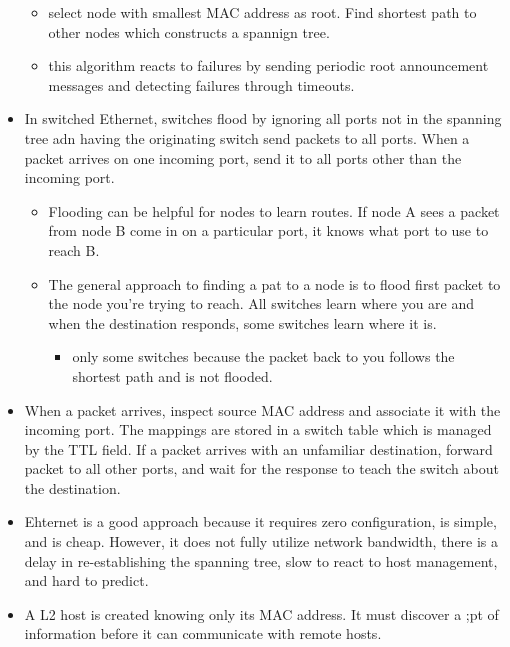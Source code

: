 \begin{itemize}
  \begin{itemize}
  \tightlist
  \item
    select node with smallest MAC address as root. Find shortest path to
    other nodes which constructs a spannign tree.
  \item
    this algorithm reacts to failures by sending periodic root
    announcement messages and detecting failures through timeouts.
  \end{itemize}
\item
  In switched Ethernet, switches flood by ignoring all ports not in the
  spanning tree adn having the originating switch send packets to all
  ports. When a packet arrives on one incoming port, send it to all
  ports other than the incoming port.

  \begin{itemize}
  \tightlist
  \item
    Flooding can be helpful for nodes to learn routes. If node A sees a
    packet from node B come in on a particular port, it knows what port
    to use to reach B.
  \item
    The general approach to finding a pat to a node is to flood first
    packet to the node you're trying to reach. All switches learn where
    you are and when the destination responds, some switches learn where
    it is.

    \begin{itemize}
    \tightlist
    \item
      only some switches because the packet back to you follows the
      shortest path and is not flooded.
    \end{itemize}
  \end{itemize}
\item
  When a packet arrives, inspect source MAC address and associate it
  with the incoming port. The mappings are stored in a switch table
  which is managed by the TTL field. If a packet arrives with an
  unfamiliar destination, forward packet to all other ports, and wait
  for the response to teach the switch about the destination.
\item
  Ehternet is a good approach because it requires zero configuration, is
  simple, and is cheap. However, it does not fully utilize network
  bandwidth, there is a delay in re-establishing the spanning tree, slow
  to react to host management, and hard to predict.
\item
  A L2 host is created knowing only its MAC address. It must discover a
  ;pt of information before it can communicate with remote hosts.


\end{itemize}
